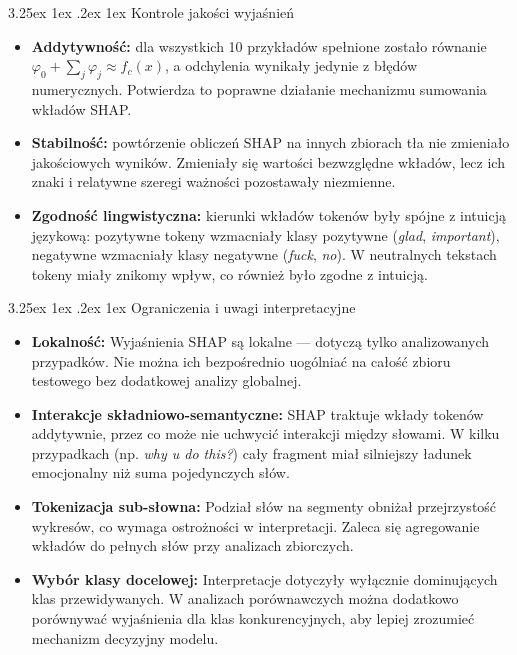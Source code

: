 \documentclass[wmii, inf, mgr]{uwmthesis}
\makeatletter
\renewcommand\paragraph{\@startsection{paragraph}{4}{\z@}%
  {3.25ex \@plus1ex \@minus.2ex}%
  {1ex}%
  {\normalfont\normalsize\bfseries}}
\makeatother
\begin{document}
\paragraph{Kontrole jakości wyjaśnień}
\begin{itemize}
	\item \textbf{Addytywność:} dla wszystkich 10 przykładów spełnione zostało równanie $\varphi_0 + \sum_j \varphi_j \approx f_c(x)$, a odchylenia wynikały jedynie z błędów numerycznych. Potwierdza to poprawne działanie mechanizmu sumowania wkładów SHAP.
	\item \textbf{Stabilność:} powtórzenie obliczeń SHAP na innych zbiorach tła nie zmieniało jakościowych wyników. Zmieniały się wartości bezwzględne wkładów, lecz ich znaki i relatywne szeregi ważności pozostawały niezmienne.
	\item \textbf{Zgodność lingwistyczna:} kierunki wkładów tokenów były spójne z intuicją językową: pozytywne tokeny wzmacniały klasy pozytywne (\textit{glad}, \textit{important}), negatywne wzmacniały klasy negatywne (\textit{fuck}, \textit{no}). W neutralnych tekstach tokeny miały znikomy wpływ, co również było zgodne z intuicją.
\end{itemize}


\paragraph{Ograniczenia i uwagi interpretacyjne}
\begin{itemize}
	\item \textbf{Lokalność:} Wyjaśnienia SHAP są lokalne — dotyczą tylko analizowanych przypadków. Nie można ich bezpośrednio uogólniać na całość zbioru testowego bez dodatkowej analizy globalnej.
	
	\item \textbf{Interakcje składniowo-semantyczne:} SHAP traktuje wkłady tokenów addytywnie, przez co może nie uchwycić interakcji między słowami. W kilku przypadkach (np. \textit{why u do this?}) cały fragment miał silniejszy ładunek emocjonalny niż suma pojedynczych słów.
	
	\item \textbf{Tokenizacja sub-słowna:} Podział słów na segmenty obniżał przejrzystość wykresów, co wymaga ostrożności w interpretacji. Zaleca się agregowanie wkładów do pełnych słów przy analizach zbiorczych.
	
	\item \textbf{Wybór klasy docelowej:} Interpretacje dotyczyły wyłącznie dominujących klas przewidywanych. W analizach porównawczych można dodatkowo porównywać wyjaśnienia dla klas konkurencyjnych, aby lepiej zrozumieć mechanizm decyzyjny modelu.
\end{itemize}
\end{document}
